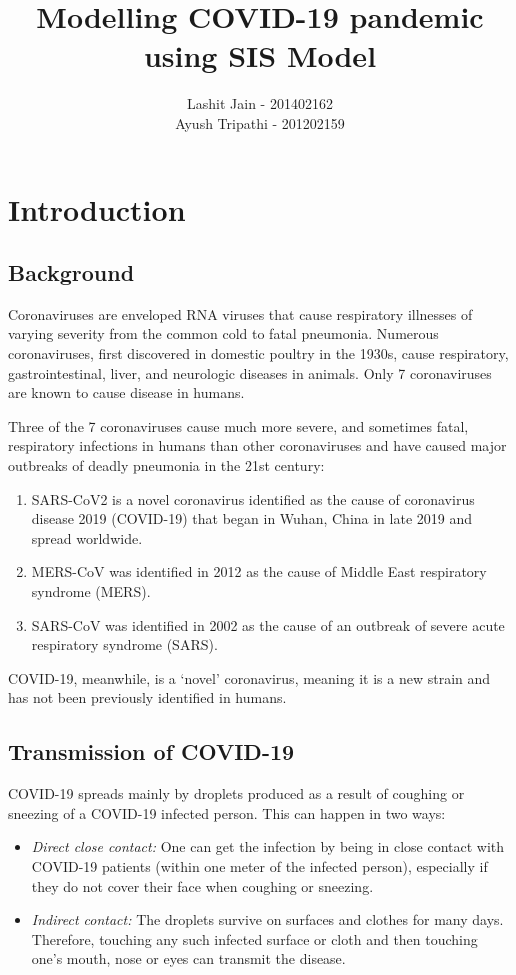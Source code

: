 \documentclass{article}
\title{Modelling COVID-19 pandemic using SIS Model}
\author{Lashit Jain - 201402162 \\ Ayush Tripathi - 201202159}
\begin{document}
	\maketitle
	\section{Introduction}
	\subsection{Background}
	Coronaviruses are enveloped RNA viruses that cause respiratory illnesses of varying severity from the common cold to fatal pneumonia. Numerous coronaviruses, first discovered in domestic poultry in the 1930s, cause respiratory, gastrointestinal, liver, and neurologic diseases in animals. Only 7 coronaviruses are known to cause disease in humans.

	Three of the 7 coronaviruses cause much more severe, and sometimes fatal, respiratory infections in humans than other coronaviruses and have caused major outbreaks of deadly pneumonia in the 21st century:
	\begin{enumerate}
	\item SARS-CoV2 is a novel coronavirus identified as the cause of coronavirus disease 2019 (COVID-19) that began in Wuhan, China in late 2019 and spread worldwide.
	\item MERS-CoV was identified in 2012 as the cause of Middle East respiratory syndrome (MERS). 
	\item SARS-CoV was identified in 2002 as the cause of an outbreak of severe acute respiratory syndrome (SARS).
	\end{enumerate}

	COVID-19, meanwhile, is a `novel' coronavirus, meaning it is a new strain and has not been previously identified in humans. 

	\subsection{Transmission of COVID-19}
	COVID-19 spreads mainly by droplets produced as a result of coughing or sneezing of a COVID-19 infected person. This can happen in two ways: 
	\begin{itemize}
	\item \textit{Direct close contact:} One can get the infection by being in close contact with COVID-19 patients (within one meter of the infected person), especially if they do not cover their face when coughing or sneezing.
	\item \textit{Indirect contact:} The droplets survive on surfaces and clothes for many days. Therefore, touching any such infected surface or cloth and then touching one’s mouth, nose or eyes can transmit the disease.
	\end{itemize}
\end{document}
